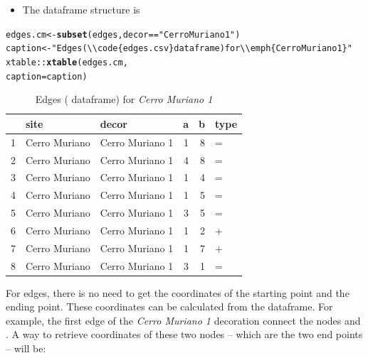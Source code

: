 \documentclass[article]{jss}\usepackage[]{graphicx}\usepackage[]{color}
\makeatletter
\newcommand{\hlstr}[1]{\textcolor[rgb]{0.192,0.494,0.8}{#1}}%
\newcommand{\hlopt}[1]{\textcolor[rgb]{0,0,0}{#1}}%
\newcommand{\hlstd}[1]{\textcolor[rgb]{0.345,0.345,0.345}{#1}}%
\newcommand{\hlkwb}[1]{\textcolor[rgb]{0.69,0.353,0.396}{#1}}%
\newcommand{\hlkwc}[1]{\textcolor[rgb]{0.333,0.667,0.333}{#1}}%
\newcommand{\hlkwd}[1]{\textcolor[rgb]{0.737,0.353,0.396}{\textbf{#1}}}%
\newenvironment{kframe}{%
 \def\at@end@of@kframe{}%
 \ifinner\ifhmode%
  \def\at@end@of@kframe{\end{minipage}}%
  \begin{minipage}{\columnwidth}%
 \fi\fi%
 \def\FrameCommand##1{\hskip\@totalleftmargin \hskip-\fboxsep
 \colorbox{shadecolor}{##1}\hskip-\fboxsep
     \hskip-\linewidth \hskip-\@totalleftmargin \hskip\columnwidth}%
 \MakeFramed {\advance\hsize-\width
   \@totalleftmargin\z@ \linewidth\hsize
   \@setminipage}}%
 {\par\unskip\endMakeFramed%
 \at@end@of@kframe}
\makeatother
\begin{document}
\begin{itemize}
\item The  dataframe structure is
\end{itemize}

\begin{kframe}
\begin{alltt}
\hlstd{edges.cm} \hlkwb{<-} \hlkwd{subset}\hlstd{(edges, decor} \hlopt{==} \hlstr{"Cerro Muriano 1"}\hlstd{)}
\hlstd{caption} \hlkwb{<-} \hlstr{"Edges (\textbackslash{}\textbackslash{}code\{edges.csv\} dataframe) for \textbackslash{}\textbackslash{}emph\{Cerro Muriano 1\}"}
\hlstd{xtable}\hlopt{::}\hlkwd{xtable}\hlstd{(edges.cm,}
               \hlkwc{caption}\hlstd{=caption)}
\end{alltt}
\end{kframe}%
\begin{table}[ht]
\centering
\begin{tabular}{rllrrl}
  \hline
 & site & decor & a & b & type \\ 
  \hline
1 & Cerro Muriano & Cerro Muriano 1 &   1 &   8 & = \\ 
  2 & Cerro Muriano & Cerro Muriano 1 &   4 &   8 & = \\ 
  3 & Cerro Muriano & Cerro Muriano 1 &   1 &   4 & = \\ 
  4 & Cerro Muriano & Cerro Muriano 1 &   1 &   5 & = \\ 
  5 & Cerro Muriano & Cerro Muriano 1 &   3 &   5 & = \\ 
  6 & Cerro Muriano & Cerro Muriano 1 &   1 &   2 & + \\ 
  7 & Cerro Muriano & Cerro Muriano 1 &   1 &   7 & + \\ 
  8 & Cerro Muriano & Cerro Muriano 1 &   3 &   1 & = \\ 
   \hline
\end{tabular}
\caption{Edges ( dataframe) for \emph{Cerro Muriano 1}} 
\end{table}


For edges, there is no need to get the coordinates of the starting point and the ending point. These coordinates can be calculated from the  dataframe. For example, the first edge of the \emph{Cerro Muriano 1} decoration connect the nodes  and . A way to retrieve coordinates of these two nodes -- which are the two end points -- will be:
\end{document}
